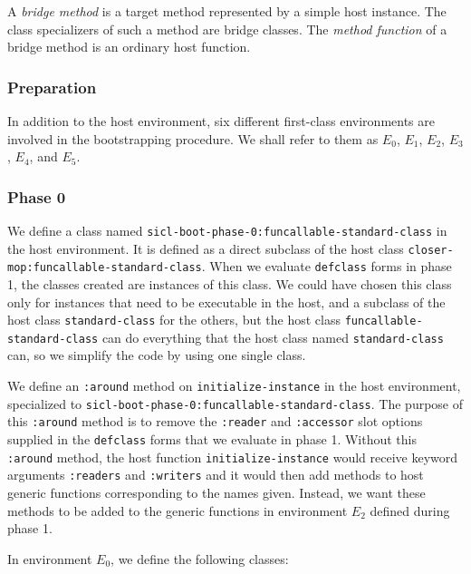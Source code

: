 \begin{definition}
A \emph{bridge method} is a target method represented by a simple host
instance.  The class specializers of such a method are bridge classes.
The \emph{method function} of a bridge method is an ordinary host
function.
\end{definition}

\subsubsection{Preparation}

In addition to the host environment, six different \sysname{}
first-class environments are involved in the bootstrapping procedure.
We shall refer to them as $E_0$, $E_1$, $E_2$, $E_3$, $E_4$, and $E_5$.

\subsubsection{Phase 0}

We define a class named
\texttt{sicl-boot-phase-0:funcallable-standard-class} in the host
environment.  It is defined as a direct subclass of the host class
\texttt{closer-mop:funcallable-standard-class}.  When we
evaluate \texttt{defclass} forms in phase 1, the classes created are
instances of this class.  We could have chosen this class only for
instances that need to be executable in the host, and a subclass of
the host class \texttt{standard-class} for the others, but the host
class \texttt{funcallable-standard-class} can do everything that the
host class named \texttt{standard-class} can, so we simplify the code by
using one single class.

We define an \texttt{:around} method on \texttt{initialize-instance}
in the host environment, specialized to
\texttt{sicl-boot-phase-0:funcallable-standard-class}.  The purpose of
this \texttt{:around} method is to remove the \texttt{:reader} and
\texttt{:accessor} slot options supplied in the \texttt{defclass}
forms that we evaluate in phase 1.  Without this \texttt{:around}
method, the host function \texttt{initialize-instance} would receive
keyword arguments \texttt{:readers} and \texttt{:writers} and it would
then add methods to host generic functions corresponding to the names
given.  Instead, we want these methods to be added to the generic
functions in environment $E_2$ defined during phase 1.

In environment $E_0$, we define the following classes:

